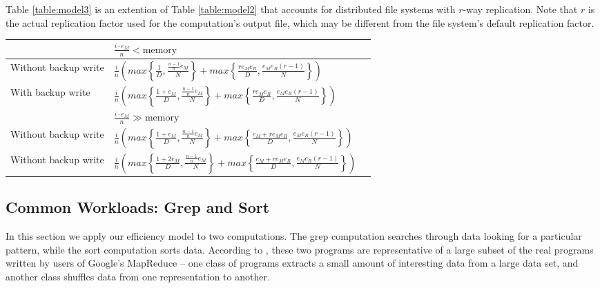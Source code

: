\documentclass{acm_proc_article-sp}
\begin{document}
Table \ref{table:model3} is an extention of Table \ref{table:model2} that
accounts for distributed file systems with $r$-way replication. Note that $r$
is the actual replication factor used for the computation's output file, which
may be different from the file system's default replication factor.

\begin{table*}
\centering
\renewcommand{\arraystretch}{1.2}
\begin{tabular}{|l|l|l|}
\hline
& $\frac{i \cdot e_M}{n}< \text{memory}$ \\ \hline
Without backup write &
$\frac{i}{n} \left( max\left\{\frac{1}{D}, \frac{\frac{n-1}{n} e_M}{N}\right\} +
max\left\{\frac{r e_M e_R}{D}, \frac{e_M e_R \left(r - 1\right)}{N}\right\} \right)$ \\ \hline
With backup write & $\frac{i}{n} \left( max\left\{\frac{1 + e_M}{D},
\frac{\frac{n-1}{n} e_M}{N}\right\} + max\left\{\frac{r e_M e_R}{D}, \frac{e_M
e_R \left(r - 1\right)}{N}\right\} \right)$ \\ \hline

& $\frac{i \cdot e_M}{n} \gg \text{memory}$ \\ \hline
Without backup write & $\frac{i}{n} \left( max\left\{\frac{1 + e_M}{D},
\frac{\frac{n-1}{n} e_M}{N}\right\} + max\left\{\frac{e_M + r e_M e_R}{D},
\frac{e_M e_R \left(r - 1\right)}{N}\right\} \right)$ \\ \hline
Without backup write & $\frac{i}{n} \left(
max\left\{\frac{1 + 2 e_M}{D}, \frac{\frac{n-1}{n} e_M}{N}\right\} +
max\left\{\frac{e_M + r e_M e_R}{D}, \frac{e_M e_R \left(r -
1\right)}{N}\right\} \right)$ \\ \hline

\end{tabular}
\caption{The execution time of a map-reduce computation on a parallel dataflow system in which output data is replicated accross $r$ nodes.}
\label{table:model3}
\end{table*}

\subsection{Common Workloads: Grep and Sort}

In this section we apply our efficiency model to two computations. The grep
computation searches through data looking for a particular pattern, while the
sort computation sorts data. According to \cite{mapreduce}, these two programs
are representative of a large subset of the real programs written by users of
Google's MapReduce -- one class of programs extracts a small amount of
interesting data from a large data set, and another class shuffles data from
one representation to another.
\end{document}
